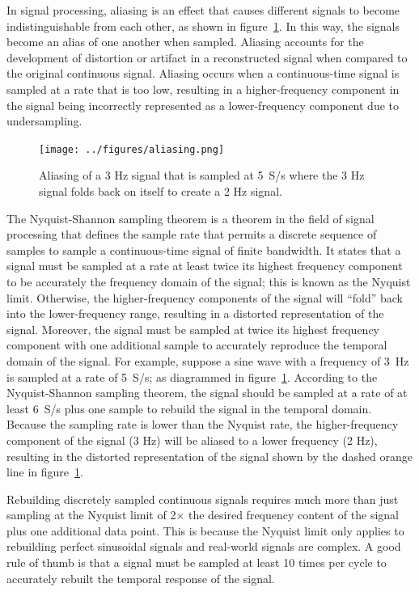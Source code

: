 \documentclass[12pt,letter]{article}
\begin{document}
In signal processing, aliasing is an effect that causes different signals to become indistinguishable from each other, as shown in figure~\ref{fig:aliasing}.  In this way, the signals become an alias of one another when sampled. Aliasing accounts for the development of distortion or artifact in a reconstructed signal when compared to the original continuous signal. Aliasing occurs when a continuous-time signal is sampled at a rate that is too low, resulting in a higher-frequency component in the signal being incorrectly represented as a lower-frequency component due to undersampling.

\begin{figure}[H]
    \centering
    \texttt{[image: ../figures/aliasing.png]}
    \caption{Aliasing of a 3 Hz signal that is sampled at 5~S/s where the 3 Hz signal folds back on itself to create a 2 Hz signal.}
    \label{fig:aliasing}
\end{figure}

The Nyquist-Shannon sampling theorem is a theorem in the field of signal processing that defines the sample rate that permits a discrete sequence of samples to sample a continuous-time signal of finite bandwidth. It states that a signal must be sampled at a rate at least twice its highest frequency component to be accurately the frequency domain of the signal; this is known as the Nyquist limit. Otherwise, the higher-frequency components of the signal will ``fold'' back into the lower-frequency range, resulting in a distorted representation of the signal. Moreover, the signal must be sampled at twice its highest frequency component with one additional sample to accurately reproduce the temporal domain of the signal. For example, suppose a sine wave with a frequency of 3~Hz is sampled at a rate of 5~S/s; as diagrammed in figure~\ref{fig:aliasing}. According to the Nyquist-Shannon sampling theorem, the signal should be sampled at a rate of at least 6~S/s plus one sample to rebuild the signal in the temporal domain. Because the sampling rate is lower than the Nyquist rate, the higher-frequency component of the signal (3 Hz) will be aliased to a lower frequency (2 Hz), resulting in the distorted representation of the signal shown by the dashed orange line in figure~\ref{fig:aliasing}.

Rebuilding discretely sampled continuous signals requires much more than just sampling at the Nyquist limit of 2$\times$ the desired frequency content of the signal plus one additional data point. This is because the Nyquist limit only applies to rebuilding perfect sinusoidal signals and real-world signals are complex. A good rule of thumb is that a signal must be sampled at least 10 times per cycle to accurately rebuilt the temporal response of the signal.
\end{document}
